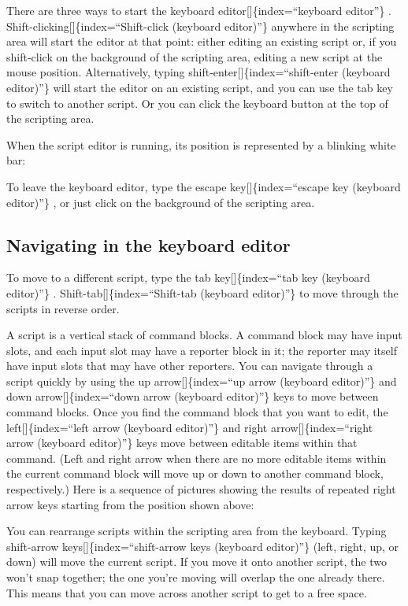 \documentclass[
  letterpaper,
]{book}
\begin{document}
There are three ways to start the keyboard
editor{[}{]}\{index=``keyboard editor''\} .
Shift-clicking{[}{]}\{index=``Shift-click (keyboard editor)''\} anywhere
in the scripting area will start the editor at that point: either
editing an existing script or, if you shift-click on the background of
the scripting area, editing a new script at the mouse position.
Alternatively, typing shift-enter{[}{]}\{index=``shift-enter (keyboard
editor)''\} will start the editor on an existing script, and you can use
the tab key to switch to another script. Or you can click the keyboard
button at the top of the scripting area.

When the script editor is running, its position is represented by a
blinking white bar:

To leave the keyboard editor, type the escape key{[}{]}\{index=``escape
key (keyboard editor)''\} , or just click on the background of the
scripting area.

\subsection{Navigating in the keyboard
editor}\label{navigating-in-the-keyboard-editor}

To move to a different script, type the tab key{[}{]}\{index=``tab key
(keyboard editor)''\} . Shift-tab{[}{]}\{index=``Shift-tab (keyboard
editor)''\} to move through the scripts in reverse order.

A script is a vertical stack of command blocks. A command block may have
input slots, and each input slot may have a reporter block in it; the
reporter may itself have input slots that may have other reporters. You
can navigate through a script quickly by using the up
arrow{[}{]}\{index=``up arrow (keyboard editor)''\} and down
arrow{[}{]}\{index=``down arrow (keyboard editor)''\} keys to move
between command blocks. Once you find the command block that you want to
edit, the left{[}{]}\{index=``left arrow (keyboard editor)''\} and right
arrow{[}{]}\{index=``right arrow (keyboard editor)''\} keys move between
editable items within that command. (Left and right arrow when there are
no more editable items within the current command block will move up or
down to another command block, respectively.) Here is a sequence of
pictures showing the results of repeated right arrow keys starting from
the position shown above:

You can rearrange scripts within the scripting area from the keyboard.
Typing shift-arrow keys{[}{]}\{index=``shift-arrow keys (keyboard
editor)''\} (left, right, up, or down) will move the current script. If
you move it onto another script, the two won't snap together; the one
you're moving will overlap the one already there. This means that you
can move across another script to get to a free space.
\end{document}
